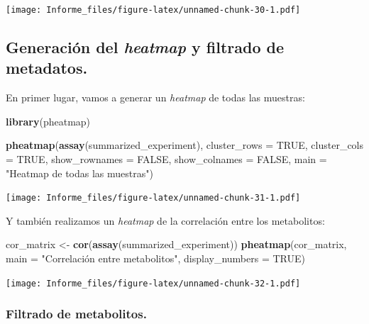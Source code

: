 \documentclass[
]{article}
\newenvironment{Shaded}{\begin{snugshade}}{\end{snugshade}}
\newcommand{\AttributeTok}[1]{\textcolor[rgb]{0.13,0.29,0.53}{#1}}
\newcommand{\ConstantTok}[1]{\textcolor[rgb]{0.56,0.35,0.01}{#1}}
\newcommand{\FunctionTok}[1]{\textcolor[rgb]{0.13,0.29,0.53}{\textbf{#1}}}
\newcommand{\NormalTok}[1]{#1}
\newcommand{\OtherTok}[1]{\textcolor[rgb]{0.56,0.35,0.01}{#1}}
\newcommand{\StringTok}[1]{\textcolor[rgb]{0.31,0.60,0.02}{#1}}
\begin{document}
\texttt{[image: Informe\_files/figure-latex/unnamed-chunk-30-1.pdf]}

\subsection{\texorpdfstring{Generación del \emph{heatmap} y filtrado de
metadatos.}{Generación del heatmap y filtrado de metadatos.}}\label{generaciuxf3n-del-heatmap-y-filtrado-de-metadatos.}

En primer lugar, vamos a generar un \emph{heatmap} de todas las
muestras:

\begin{Shaded}
\begin{Highlighting}[]
\FunctionTok{library}\NormalTok{(pheatmap)}

\FunctionTok{pheatmap}\NormalTok{(}\FunctionTok{assay}\NormalTok{(summarized\_experiment), }\AttributeTok{cluster\_rows =} \ConstantTok{TRUE}\NormalTok{, }\AttributeTok{cluster\_cols =} \ConstantTok{TRUE}\NormalTok{, }
         \AttributeTok{show\_rownames =} \ConstantTok{FALSE}\NormalTok{, }\AttributeTok{show\_colnames =} \ConstantTok{FALSE}\NormalTok{, }\AttributeTok{main =} \StringTok{"Heatmap de todas las muestras"}\NormalTok{)}
\end{Highlighting}
\end{Shaded}

\texttt{[image: Informe\_files/figure-latex/unnamed-chunk-31-1.pdf]}

Y también realizamos un \emph{heatmap} de la correlación entre los
metabolitos:

\begin{Shaded}
\begin{Highlighting}[]
\NormalTok{cor\_matrix }\OtherTok{\textless{}{-}} \FunctionTok{cor}\NormalTok{(}\FunctionTok{assay}\NormalTok{(summarized\_experiment))}
\FunctionTok{pheatmap}\NormalTok{(cor\_matrix, }\AttributeTok{main =} \StringTok{"Correlación entre metabolitos"}\NormalTok{, }\AttributeTok{display\_numbers =} \ConstantTok{TRUE}\NormalTok{)}
\end{Highlighting}
\end{Shaded}

\texttt{[image: Informe\_files/figure-latex/unnamed-chunk-32-1.pdf]}

\subsubsection{Filtrado de metabolitos.}\label{filtrado-de-metabolitos.}
\end{document}
